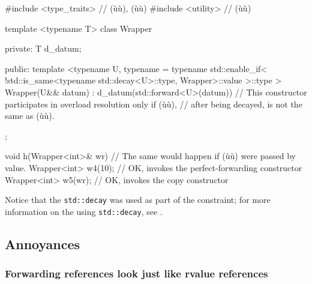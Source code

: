\begin{emcppshiddenlisting}[emcppsbatch=e19]
#include <type_traits>  // (ù{}ù), (ù{}ù)
#include <utility>  // (ù{}ù)
\end{emcppshiddenlisting}
\begin{emcppslisting}[emcppsbatch=e19]
template <typename T>
class Wrapper
{
private:
    T d_datum;

public:
    template <typename U,
        typename = typename std::enable_if<
            !std::is_same<typename std::decay<U>::type, Wrapper>::value
        >::type
    >
    Wrapper(U&& datum) : d_datum(std::forward<U>(datum)) { }
        // This constructor participates in overload resolution only if (ù{}ù),
        // after being decayed, is not the same as (ù{}ù).
};

void h(Wrapper<int>& wr)  // The same would happen if (ù{}ù) were passed by value.
{
    Wrapper<int> w4(10);  // OK, invokes the perfect-forwarding constructor
    Wrapper<int> w5(wr);  // OK, invokes the copy constructor
}
\end{emcppslisting}

\noindent Notice that the \lstinline!std::decay!  was used as
part of the constraint; for more information on the using
\lstinline!std::decay!, see . 

\subsection[Annoyances]{Annoyances}\label{annoyances-forwardingref}

\subsubsection[Forwarding references look just like rvalue references]{Forwarding references look just like rvalue references}\label{forwarding-references-look-just-like-rvalue-references}

